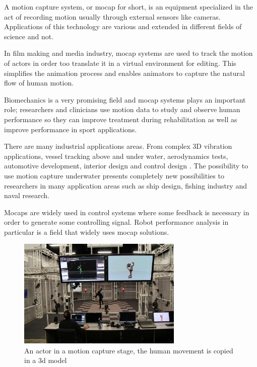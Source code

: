 A motion capture system, or mocap for short, is an equipment specialized in the act of recording motion \cite{qualisys} usually through external sensors like cameras. Applications of this technology are various and extended in different fields of science and not.\par In film making and media industry, mocap systems are used to track the motion of actors in order too translate it in a virtual environment for editing. This simplifies  the animation process and enables animators to capture the natural flow of human motion.\par Biomechanics is a very promising field and mocap systems plays an important role;  researchers and clinicians use motion data to study and observe human performance so they can improve treatment during rehabilitation as well as improve performance in sport applications. \par There are many industrial applications areas. From complex 3D vibration applications, vessel tracking above and under water, aerodynamics tests, automotive development, interior design and control design . The possibility to use motion capture underwater presents completely new possibilities to researchers in many application areas such as ship design, fishing industry and naval research.\par Mocaps are widely used in control systems where some feedback is necessary in order to generate some controlling signal. Robot performance analysis in particular is a field that widely uses mocap solutions.
\begin{figure}[h]
\centering
 \includegraphics[width=0.7\textwidth]{motionstage.jpg}
 \caption[Motion capture stage]{An actor in a motion capture stage, the human movement is copied in a 3d model}
 \label{figure:motionstage}
\end{figure}

